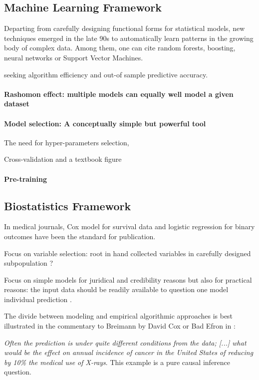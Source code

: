 \documentclass[french,12pt,twoside,a4paper]{book}
\begin{document}
\begin{background_box_left}

  \subsection{Machine Learning Framework}\label{subsec:intro:machine_learning}

  Departing from carefully designing functional forms for statistical models,
  new techniques emerged in the late 90s to automatically learn patterns in the
  growing body of complex data. Among them, one can cite random forests,
  boosting, neural networks or Support Vector Machines.


  seeking algorithm efficiency and out-of sample predictive accuracy.


  \paragraph{Rashomon effect: multiple models can equally well model a given dataset}

  \paragraph{Model selection: A conceptually simple but powerful tool}

  The need for hyper-parameters selection,

  Cross-validation \citep{stone1974cross} and a textbook figure

  \paragraph{Pre-training}


  \subsection{Biostatistics Framework}\label{subsec:intro:biostatistics_framework}

  In medical journals, Cox model for survival data and logistic regression for
  binary outcomes have been the standard for publication.

  Focus on variable selection: root in hand collected variables in carefully
  designed subpopulation ?

  Focus on simple models for juridical and credibility reasons but also for
  practical reasons: the input data should be readily available to question one
  model individual prediction \citep{wyatt1995commentary}.

  The divide between modeling and empirical algorithmic approaches is best
  illustrated in the commentary to Breimann by David Cox or Bad Efron in  \cite{}:

  \textit{Often the prediction is under quite different conditions from the
  data; [...] what would be the effect on annual incidence of cancer in the
  United States of reducing by 10\% the medical use of X-rays}. This example is
  a pure causal inference question.

\end{background_box_left}
\end{document}

